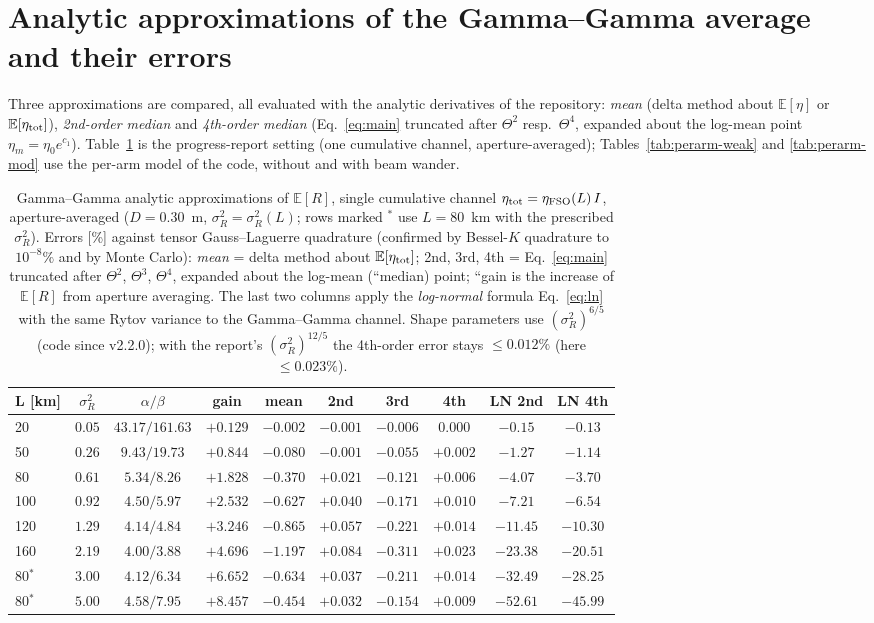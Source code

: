 \documentclass[11pt,a4paper]{article}
\theoremstyle{plain}
\theoremstyle{remark}
\begin{document}
\section{Analytic approximations of the Gamma--Gamma average and their errors}
\label{sec:approx}
Three approximations are compared, all evaluated with the analytic derivatives of the repository: \emph{mean} (delta method about $\mathbb E[\eta]$ or $\mathbb E[\eta_{\rm tot}]$), \emph{2nd-order median} and \emph{4th-order median} (Eq.~\eqref{eq:main} truncated after $\Theta^2$ resp.\ $\Theta^4$, expanded about the log-mean point $\eta_m=\eta_0e^{c_1}$). Table~\ref{tab:gg-single} is the progress-report setting (one cumulative channel, aperture-averaged); Tables~\ref{tab:perarm-weak} and \ref{tab:perarm-mod} use the per-arm model of the code, without and with beam wander.
\begin{table}[htbp]
\centering\scriptsize
\caption{Gamma--Gamma analytic approximations of $\mathbb E[R]$, single cumulative channel $\eta_{\rm tot}=\eta_{\rm FSO}(L)\,I$, aperture-averaged ($D=0.30$~m, $\sigma_R^2=\sigma_R^2(L)$; rows marked $^{*}$ use $L=80$~km with the prescribed $\sigma_R^2$). Errors [\%] against tensor Gauss--Laguerre quadrature (confirmed by Bessel-$K$ quadrature to $10^{-8}\%$ and by Monte Carlo): \emph{mean} = delta method about $\mathbb E[\eta_{\rm tot}]$; 2nd, 3rd, 4th = Eq.~\eqref{eq:main} truncated after $\Theta^2$, $\Theta^3$, $\Theta^4$, expanded about the log-mean (``median) point; ``gain is the increase of $\mathbb E[R]$ from aperture averaging. The last two columns apply the \emph{log-normal} formula Eq.~\eqref{eq:ln} with the same Rytov variance to the Gamma--Gamma channel. Shape parameters use $(\sigma_R^2)^{6/5}$ (code since v2.2.0); with the report's $(\sigma_R^2)^{12/5}$ the 4th-order error stays $\le0.012\%$ (here $\le0.023\%$).}
\label{tab:gg-single}
\begin{tabular}{lccccccccc}
\toprule
L [km] & $\sigma_R^2$ & $\alpha/\beta$ & gain & mean & 2nd & 3rd & 4th & LN 2nd & LN 4th\\
\midrule
20 & $0.05$ & $43.17/161.63$ & $+0.129$ & $-0.002$ & $-0.001$ & $-0.006$ & $0.000$ & $-0.15$ & $-0.13$ \\
50 & $0.26$ & $9.43/19.73$ & $+0.844$ & $-0.080$ & $-0.001$ & $-0.055$ & $+0.002$ & $-1.27$ & $-1.14$ \\
80 & $0.61$ & $5.34/8.26$ & $+1.828$ & $-0.370$ & $+0.021$ & $-0.121$ & $+0.006$ & $-4.07$ & $-3.70$ \\
100 & $0.92$ & $4.50/5.97$ & $+2.532$ & $-0.627$ & $+0.040$ & $-0.171$ & $+0.010$ & $-7.21$ & $-6.54$ \\
120 & $1.29$ & $4.14/4.84$ & $+3.246$ & $-0.865$ & $+0.057$ & $-0.221$ & $+0.014$ & $-11.45$ & $-10.30$ \\
160 & $2.19$ & $4.00/3.88$ & $+4.696$ & $-1.197$ & $+0.084$ & $-0.311$ & $+0.023$ & $-23.38$ & $-20.51$ \\
80$^{*}$ & $3.00$ & $4.12/6.34$ & $+6.652$ & $-0.634$ & $+0.037$ & $-0.211$ & $+0.014$ & $-32.49$ & $-28.25$ \\
80$^{*}$ & $5.00$ & $4.58/7.95$ & $+8.457$ & $-0.454$ & $+0.032$ & $-0.154$ & $+0.009$ & $-52.61$ & $-45.99$ \\


\end{tabular}
\end{table}
\end{document}
